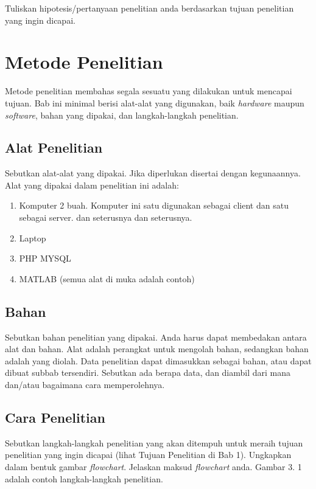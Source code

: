 \documentclass[12pt]{article}
\begin{document}
Tuliskan hipotesis/pertanyaan penelitian anda berdasarkan tujuan penelitian yang ingin dicapai.

\pagebreak{}


\section{Metode Penelitian}

Metode penelitian membahas segala sesuatu yang dilakukan untuk mencapai tujuan. Bab ini minimal berisi alat-alat yang digunakan, baik \textit{hardware} maupun \textit{software}, bahan yang dipakai, dan langkah-langkah penelitian. 

\subsection{Alat Penelitian}

Sebutkan alat-alat yang dipakai. Jika diperlukan disertai dengan kegunaannya. Alat yang dipakai dalam penelitian ini adalah:

\begin{enumerate}
\item Komputer 2 buah. Komputer ini satu digunakan sebagai client dan satu sebagai server. dan seterusnya dan seterusnya.

\item Laptop
\item PHP MYSQL
\item MATLAB (semua alat di muka adalah contoh)
\end{enumerate}

\subsection{Bahan}
Sebutkan bahan penelitian yang dipakai. Anda harus dapat membedakan antara alat dan bahan. Alat adalah perangkat untuk mengolah bahan, sedangkan bahan adalah yang diolah. Data penelitian dapat dimasukkan sebagai bahan, atau dapat dibuat subbab tersendiri. Sebutkan ada berapa data, dan diambil dari mana dan/atau bagaimana cara memperolehnya.

\subsection{Cara Penelitian}
Sebutkan langkah-langkah penelitian yang akan ditempuh untuk meraih tujuan penelitian yang ingin dicapai (lihat Tujuan Penelitian di Bab 1). Ungkapkan dalam bentuk gambar \textit{flowchart}. Jelaskan maksud \textit{flowchart} anda. Gambar 3. 1 adalah contoh langkah-langkah penelitian.
\end{document}
